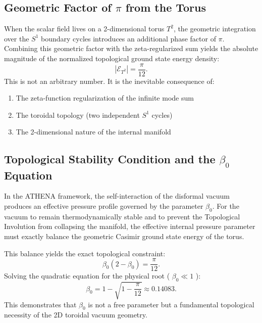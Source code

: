 \documentclass[11pt,a4paper]{article}
\begin{document}
\subsection{Geometric Factor of \(\pi\) from the Torus}
When the scalar field lives on a 2-dimensional torus \(T^2\), the geometric integration over the \(S^1\) boundary cycles introduces an additional phase factor of \(\pi\). Combining this geometric factor with the zeta-regularized sum yields the absolute magnitude of the normalized topological ground state energy density:
\begin{equation}
|\mathcal{E}_{T^2}| = \frac{\pi}{12}. \tag{14}
\end{equation}
This is not an arbitrary number. It is the inevitable consequence of:
\begin{enumerate}
\item The zeta-function regularization of the infinite mode sum
\item The toroidal topology (two independent \(S^1\) cycles)
\item The 2-dimensional nature of the internal manifold
\end{enumerate}

\subsection{Topological Stability Condition and the \(\beta_0\) Equation}
In the ATHENA framework, the self-interaction of the disformal vacuum produces an effective pressure profile governed by the parameter \(\beta_0\). For the vacuum to remain thermodynamically stable and to prevent the Topological Involution from collapsing the manifold, the effective internal pressure parameter must exactly balance the geometric Casimir ground state energy of the torus.

This balance yields the exact topological constraint:
\begin{equation}
\beta_0(2 - \beta_0) = \frac{\pi}{12}. \tag{15}
\end{equation}
Solving the quadratic equation for the physical root ( \(\beta_0 \ll 1\) ):
\begin{equation}
\beta_0 = 1 - \sqrt{1 - \frac{\pi}{12}} \approx 0.14083. \tag{16}
\end{equation}
This demonstrates that \(\beta_0\) is not a free parameter but a fundamental topological necessity of the 2D toroidal vacuum geometry.
\end{document}
